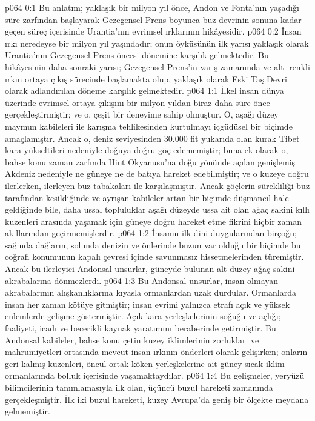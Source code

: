 \vs p064 0:1 Bu anlatım; yaklaşık bir milyon yıl önce, Andon ve Fonta’nın yaşadığı süre zarfından başlayarak Gezegensel Prens boyunca buz devrinin sonuna kadar geçen süreç içerisinde Urantia’nın evrimsel ırklarının hikâyesidir.
\vs p064 0:2 İnsan ırkı neredeyse bir milyon yıl yaşındadır; onun öyküsünün ilk yarısı yaklaşık olarak Urantia’nın Gezegensel Prens\hyp{}öncesi dönemine karşılık gelmektedir. Bu hikâyesinin daha sonraki yarısı; Gezegensel Prens’in varış zamanında ve altı renkli ırkın ortaya çıkış sürecinde başlamakta olup, yaklaşık olarak Eski Taş Devri olarak adlandırılan döneme karşılık gelmektedir.
\vs p064 1:1 İlkel insan dünya üzerinde evrimsel ortaya çıkışını bir milyon yıldan biraz daha süre önce gerçekleştirmiştir; ve o, çeşit bir deneyime sahip olmuştur. O, aşağı düzey maymun kabileleri ile karışma tehlikesinden kurtulmayı içgüdüsel bir biçimde amaçlamıştır. Ancak o, deniz seviyesinden 30.000 fit yukarıda olan kurak Tibet kara yükseltileri nedeniyle doğuya doğru göç edememiştir; buna ek olarak o, bahse konu zaman zarfında Hint Okyanusu’na doğu yönünde açılan genişlemiş Akdeniz nedeniyle ne güneye ne de batıya hareket edebilmiştir; ve o kuzeye doğru ilerlerken, ilerleyen buz tabakaları ile karşılaşmıştır. Ancak göçlerin sürekliliği buz tarafından kesildiğinde ve ayrışan kabileler artan bir biçimde düşmancıl hale geldiğinde bile, daha ussal topluluklar aşağı düzeyde ussa ait olan ağaç sakini kıllı kuzenleri arasında yaşamak için güneye doğru hareket etme fikrini hiçbir zaman akıllarından geçirmemişlerdir.
\vs p064 1:2 İnsanın ilk dini duygularından birçoğu; sağında dağların, solunda denizin ve önlerinde buzun var olduğu bir biçimde bu coğrafi konumunun kapalı çevresi içinde savunmasız hissetmelerinden türemiştir. Ancak bu ilerleyici Andonsal unsurlar, güneyde bulunan alt düzey ağaç sakini akrabalarına dönmezlerdi.
\vs p064 1:3 Bu Andonsal unsurlar, insan\hyp{}olmayan akrabalarının alışkanlıklarına kıyasla ormanlardan uzak durdular. Ormanlarda insan her zaman kötüye gitmiştir; insan evrimi yalnızca etrafı açık ve yüksek enlemlerde gelişme göstermiştir. Açık kara yerleşkelerinin soğuğu ve açlığı; faaliyeti, icadı ve becerikli kaynak yaratımını beraberinde getirmiştir. Bu Andonsal kabileler, bahse konu çetin kuzey iklimlerinin zorlukları ve mahrumiyetleri ortasında mevcut insan ırkının önderleri olarak gelişirken; onların geri kalmış kuzenleri, öncül ortak köken yerleşkelerine ait güney sıcak iklim ormanlarında bolluk içerisinde yaşamaktaydılar.
\vs p064 1:4 Bu gelişmeler, yeryüzü bilimcilerinin tanımlamasıyla ilk olan, üçüncü buzul hareketi zamanında gerçekleşmiştir. İlk iki buzul hareketi, kuzey Avrupa’da geniş bir ölçekte meydana gelmemiştir.
